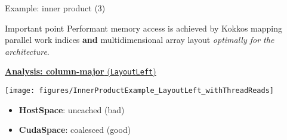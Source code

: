 \ifmedium
\begin{frame}[fragile]{Example: inner product (3)}

  \begin{block}{Important point}
    Performant memory access is achieved by Kokkos mapping parallel work indices \textbf{and} multidimensional array layout \emph{optimally for the architecture}.
  \end{block}

  \vspace{3pt}

  \ul{\textbf{Analysis: column-major} (\texttt{LayoutLeft})}

  \vspace{-10pt}

  \begin{center}
    \texttt{[image: figures/InnerProductExample\_LayoutLeft\_withThreadReads]}
  \end{center}

  \vspace{-28pt}
  \pause

  \begin{itemize}
    \item{\textbf{HostSpace}: uncached ({\color{red}bad})}
    \item{\textbf{CudaSpace}: coalesced ({\color{darkgreen}good})}
  \end{itemize}

\end{frame}
\fi
\setcounter{subfigure}{0}%


